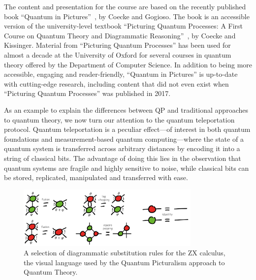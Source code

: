 The content and presentation for the course are based on the recently published book ``Quantum in Pictures''~\cite{coecke2022quantum}, by Coecke and Gogioso.
The book is an accessible version of the university-level textbook ``Picturing Quantum Processes: A First Course on Quantum Theory and Diagrammatic Reasoning''~\cite{CKbook}, by Coecke and Kissinger.
Material from ``Picturing Quantum Processes'' has been used for almost a decade at the University of Oxford for several courses in quantum theory offered by the Department of Computer Science.
In addition to being more accessible, engaging and reader-friendly, ``Quantum in Pictures'' is up-to-date with cutting-edge research, including content that did not even exist when ``Picturing Quantum Processes'' was published in 2017.

As an example to explain the differences between QP and traditional approaches to quantum theory, we now turn our attention to the quantum teleportation protocol.
Quantum teleportation is a peculiar effect---of interest in both quantum foundations and measurement-based quantum computing---where the state of a quantum system is transferred across arbitrary distances by encoding it into a string of classical bits.
The advantage of doing this lies in the observation that quantum systems are fragile and highly sensitive to noise, while classical bits can be stored, replicated, manipulated and transferred with ease.

\begin{figure}[h]
\centering
\includegraphics[width=0.8\textwidth]{Sections/pictures/zx-rules.png}
\caption{A selection of diagrammatic substitution rules for the ZX calculus, the visual language used by the Quantum Picturalism approach to Quantum Theory.}
\label{fig:zx-rules}
\end{figure}

